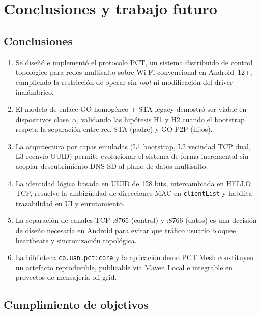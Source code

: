 \chapter{Conclusiones y trabajo futuro}
\label{cap:conclusiones}

\section{Conclusiones}
\label{sec:conclusiones}

\begin{enumerate}
  \item Se diseñó e implementó el protocolo PCT, un sistema distribuido de control topológico para redes multisalto sobre Wi-Fi convencional en Android~12+, cumpliendo la restricción de operar sin \emph{root} ni modificación del driver inalámbrico.

  \item El modelo de enlace GO homogéneo + STA legacy demostró ser viable en dispositivos clase~$\alpha$, validando las hipótesis H1 y H2 cuando el bootstrap respeta la separación entre red STA (padre) y GO P2P (hijos).

  \item La arquitectura por capas emuladas (L1 bootstrap, L2 vecindad TCP dual, L3 reenvío UUID) permite evolucionar el sistema de forma incremental sin acoplar descubrimiento DNS-SD al plano de datos multisalto.

  \item La identidad lógica basada en UUID de 128 bits, intercambiada en HELLO TCP, resuelve la ambigüedad de direcciones MAC en \texttt{clientList} y habilita trazabilidad en UI y enrutamiento.

  \item La separación de canales TCP :8765 (control) y :8766 (datos) es una decisión de diseño necesaria en Android para evitar que tráfico usuario bloquee heartbeats y sincronización topológica.

  \item La biblioteca \texttt{co.uan.pct:core} y la aplicación demo PCT Mesh constituyen un artefacto reproducible, publicable vía Maven Local e integrable en proyectos de mensajería off-grid.
\end{enumerate}

\section{Cumplimiento de objetivos}
\label{sec:cumplimiento-objetivos}


